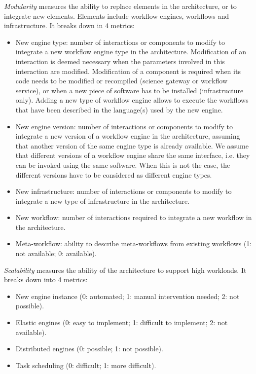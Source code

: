 \documentclass[preprint,3p,twocolumn]{elsarticle}
\begin{document}
\emph{Modularity} measures the ability to replace elements in the
architecture, or to integrate new elements. Elements include
workflow engines, workflows and infrastructure. It breaks down in 4
metrics:
\begin{itemize}[itemsep=0cm]
\item New engine type: number of interactions or components to modify
  to integrate a new workflow engine type in the
  architecture. Modification of an interaction is deemed necessary
  when the parameters involved in this interaction are
  modified. Modification of a component is required when its code
  needs to be modified or recompiled (science gateway or workflow
  service), or when a new piece of software has to be installed
  (infrastructure only). Adding a new type of workflow engine allows
  to execute the workflows that have been described in the language(s)
  used by the new engine.
\item New engine version: number of interactions or components to
  modify to integrate a new version of a workflow engine in the
  architecture, assuming that another version of the same engine type
  is already available. We assume that different versions of a
  workflow engine share the same interface, i.e. they can be invoked
  using the same software. When this is not the case, the different
  versions have to be considered as different engine types. 
\item New infrastructure: number of interactions or components to
  modify to integrate a new type of infrastructure in the
  architecture.
\item New workflow: number of interactions required to integrate a new
  workflow in the architecture.
\item Meta-workflow: ability to describe meta-workflows from existing
  workflows (1: not available; 0: available).
\end{itemize}

\emph{Scalability} measures the ability of the architecture to support
high workloads. It breaks down into 4 metrics:
\begin{itemize}[itemsep=0cm]
\item New engine instance (0: automated; 1: manual intervention needed; 2: not possible).
\item Elastic engines (0: easy to implement; 1: difficult to
  implement; 2: not available).
\item Distributed engines (0: possible; 1: not possible).
\item Task scheduling (0: difficult; 1: more difficult).
\end{itemize}
\end{document}
